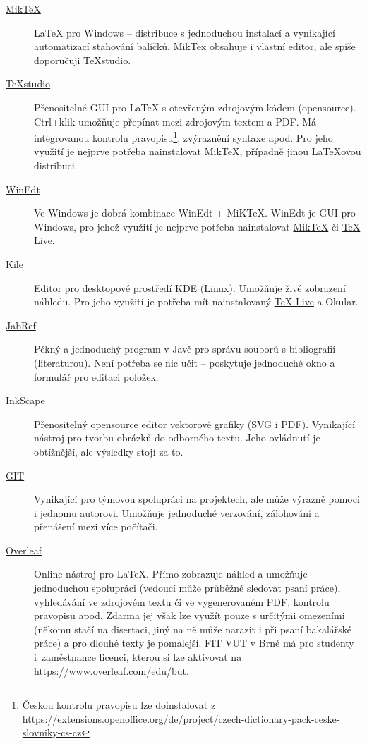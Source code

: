 \begin{description}
	\item[\href{http://miktex.org/download}{MikTeX}] \LaTeX{} pro Windows -- distribuce s jednoduchou instalací a vynikající automatizací stahování balíčků. MikTex obsahuje i vlastní editor, ale spíše doporučuji TeXstudio.
	\item[\href{http://texstudio.sourceforge.net/}{TeXstudio}] Přenositelné GUI pro \LaTeX{} s otevřeným zdrojovým kódem (opensource).  Ctrl+klik umožňuje přepínat mezi zdrojovým textem a PDF. Má integrovanou kontrolu pravopisu\footnote{Českou kontrolu pravopisu lze doinstalovat z \url{https://extensions.openoffice.org/de/project/czech-dictionary-pack-ceske-slovniky-cs-cz}}, zvýraznění syntaxe apod. Pro jeho využití je nejprve potřeba nainstalovat MikTeX, případně jinou \LaTeX ovou distribuci.
	\item[\href{http://www.winedt.com/}{WinEdt}] Ve Windows je dobrá kombinace WinEdt + MiKTeX. WinEdt je GUI pro Windows, pro jehož využití je nejprve potřeba nainstalovat \href{http://miktex.org/download}{MikTeX} či \href{http://www.tug.org/texlive/}{TeX Live}. 
	\item[\href{http://kile.sourceforge.net/}{Kile}] Editor pro desktopové prostředí KDE (Linux). Umožňuje živé zobrazení náhledu. Pro jeho využití je potřeba mít nainstalovaný \href{http://www.tug.org/texlive/}{TeX Live} a Okular. 
	\item[\href{http://jabref.sourceforge.net/download.php}{JabRef}] Pěkný a jednoduchý program v Javě pro správu souborů s bibliografií (literaturou). Není potřeba se nic učit -- poskytuje jednoduché okno a formulář pro editaci položek.
	\item[\href{https://inkscape.org/en/download/}{InkScape}] Přenositelný opensource editor vektorové grafiky (SVG i PDF). Vynikající nástroj pro tvorbu obrázků do odborného textu. Jeho ovládnutí je obtížnější, ale výsledky stojí za to.
	\item[\href{https://git-scm.com/}{GIT}] Vynikající pro týmovou spolupráci na projektech, ale může výrazně pomoci i jednomu autorovi. Umožňuje jednoduché verzování, zálohování a přenášení mezi více počítači.
	\item[\href{http://www.overleaf.com/}{Overleaf}] Online nástroj pro \LaTeX{}. Přímo zobrazuje náhled a umožňuje jednoduchou spolupráci (vedoucí může průběžně sledovat psaní práce), vyhledávání ve zdrojovém textu či ve vygenerovaném PDF, kontrolu pravopisu apod. Zdarma jej však lze využít pouze s určitými omezeními (někomu stačí na disertaci, jiný na ně může narazit i při psaní bakalářské práce) a pro dlouhé texty je pomalejší. FIT VUT v Brně má pro studenty i~zaměstnance licenci, kterou si lze aktivovat na \url{https://www.overleaf.com/edu/but}.
\end{description}


